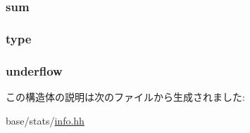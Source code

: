 \hypertarget{structStats_1_1DistData_ab5b201cce7e10c48f62b71605e75707e}{
\subsubsection[{sum}]{ {\bf sum}}}
\label{structStats_1_1DistData_ab5b201cce7e10c48f62b71605e75707e}
\hypertarget{structStats_1_1DistData_ae3815d58610a170fac9494df971f9e75}{
\subsubsection[{type}]{ {\bf type}}}
\label{structStats_1_1DistData_ae3815d58610a170fac9494df971f9e75}
\hypertarget{structStats_1_1DistData_af9e29e4a48415bdab1a3273284c1f7d2}{
\subsubsection[{underflow}]{ {\bf underflow}}}
\label{structStats_1_1DistData_af9e29e4a48415bdab1a3273284c1f7d2}


この構造体の説明は次のファイルから生成されました:\begin{DoxyCompactItemize}
\item 
base/stats/\hyperlink{info_8hh}{info.hh}\end{DoxyCompactItemize}
